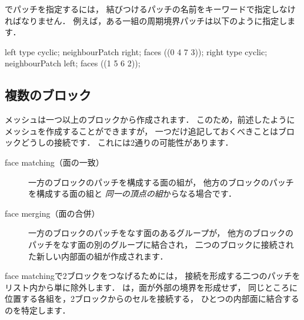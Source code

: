でパッチを指定するには，
結びつけるパッチの名前をキーワードで指定しなければなりません．
%
%
例えば，ある一組の周期境界パッチは以下のように指定します．
\begin{OFverbatim}[file]
left
{
    type            cyclic;
    neighbourPatch  right;
    faces           ((0 4 7 3));
}
right
{
    type            cyclic;
    neighbourPatch  left;
    faces           ((1 5 6 2));
}
\end{OFverbatim}


\subsection{複数のブロック}
\label{ssec:5.3.2}
メッシュは一つ以上のブロックから作成されます．
このため，前述したようにメッシュを作成することができますが，
一つだけ追記しておくべきことはブロックどうしの接続です．
これには2通りの可能性があります．
\begin{description}
 \item[face matching（面の一致）]
            一方のブロックのパッチを構成する面の組が，
            他方のブロックのパッチを構成する面の組と
            \emph{同一の頂点の組}からなる場合です．
 \item[face merging（面の合併）]
            一方のブロックのパッチをなす面のあるグループが，
            他方のブロックのパッチをなす面の別のグループに結合され，
            二つのブロックに接続された新しい内部面の組が作成されます．
\end{description}
face matchingで2ブロックをつなげるためには，
接続を形成する二つのパッチをリスト内から単に除外します．
は，面が外部の境界を形成せず，
同じところに位置する各組を，2ブロックからのセルを接続する，
ひとつの内部面に結合するのを特定します．

